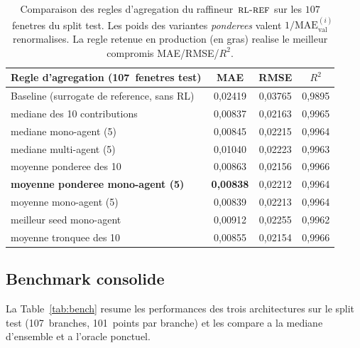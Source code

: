 \documentclass[11pt,a4paper]{article}
\newcommand{\RLR}{\textsc{rl-ref}}           %
\begin{document}
\begin{table}[h]
\centering
\small
\begin{tabular}{lccc}
\toprule
Regle d'agregation (107~fenetres test)
   & MAE       & RMSE      & $R^2$    \\
\midrule
Baseline (surrogate de reference, sans RL)
   & 0{,}02419 & 0{,}03765 & 0{,}9895 \\
\midrule
mediane des 10 contributions
   & 0{,}00837 & 0{,}02163 & 0{,}9965 \\
mediane mono-agent (5)
   & 0{,}00845 & 0{,}02215 & 0{,}9964 \\
mediane multi-agent (5)
   & 0{,}01040 & 0{,}02223 & 0{,}9963 \\
moyenne ponderee des 10
   & 0{,}00863 & 0{,}02156 & 0{,}9966 \\
\textbf{moyenne ponderee mono-agent (5)}
   & \textbf{0{,}00838} & 0{,}02212 & 0{,}9964 \\
moyenne mono-agent (5)
   & 0{,}00839 & 0{,}02213 & 0{,}9964 \\
meilleur seed mono-agent
   & 0{,}00912 & 0{,}02255 & 0{,}9962 \\
moyenne tronquee des 10
   & 0{,}00855 & 0{,}02154 & 0{,}9966 \\
\bottomrule
\end{tabular}
\caption{Comparaison des regles d'agregation du raffineur~$\RLR$
sur les $107$~fenetres du split test. Les poids des variantes
\emph{ponderees} valent $1/\mathrm{MAE}_\text{val}^{(i)}$
renormalises. La regle retenue en production (en gras) realise le
meilleur compromis MAE/RMSE/$R^2$.}
\label{tab:rl_agg}
\end{table}

\subsection{Benchmark consolide}

La Table~\ref{tab:bench} resume les performances des trois
architectures sur le split test (107~branches, 101~points par
branche) et les compare a la mediane d'ensemble et a l'oracle
ponctuel.
\end{document}
